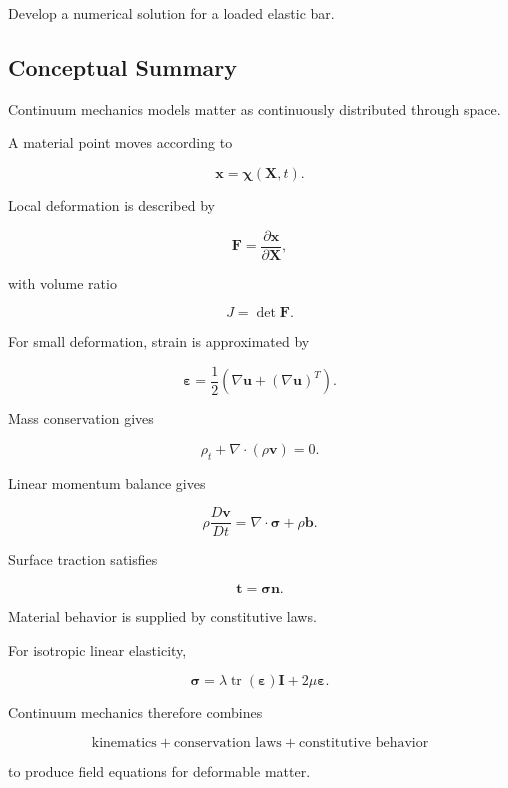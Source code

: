\begin{exercise}[4]
Develop a numerical solution for a loaded elastic bar.
\end{exercise}

\subsection{Conceptual Summary}
\label{subsec:continuum-mechanics-summary}

Continuum mechanics models matter as continuously distributed through space.

A material point moves according to

\[
\boxed{
\mathbf{x}
=
\boldsymbol{\chi}(\mathbf{X},t).
}
\]

Local deformation is described by

\[
\boxed{
\mathbf{F}
=
\frac{\partial\mathbf{x}}
{\partial\mathbf{X}},
}
\]

with volume ratio

\[
\boxed{
J=\det\mathbf{F}.
}
\]

For small deformation, strain is approximated by

\[
\boxed{
\boldsymbol{\varepsilon}
=
\frac12
\left(
\nabla\mathbf{u}
+
(\nabla\mathbf{u})^T
\right).
}
\]

Mass conservation gives

\[
\boxed{
\rho_t
+
\nabla\cdot(\rho\mathbf{v})
=
0.
}
\]

Linear momentum balance gives

\[
\boxed{
\rho
\frac{D\mathbf{v}}{Dt}
=
\nabla\cdot\boldsymbol{\sigma}
+
\rho\mathbf{b}.
}
\]

Surface traction satisfies

\[
\boxed{
\mathbf{t}
=
\boldsymbol{\sigma}\mathbf{n}.
}
\]

Material behavior is supplied by constitutive laws.

For isotropic linear elasticity,

\[
\boxed{
\boldsymbol{\sigma}
=
\lambda
\operatorname{tr}
(\boldsymbol{\varepsilon})
\mathbf{I}
+
2\mu\boldsymbol{\varepsilon}.
}
\]

Continuum mechanics therefore combines

\[
\boxed{
\text{kinematics}
+
\text{conservation laws}
+
\text{constitutive behavior}
}
\]

to produce field equations for deformable matter.

